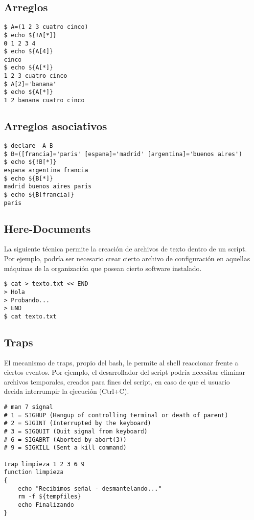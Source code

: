 \subsection{Arreglos}

\begin{lstlisting}
$ A=(1 2 3 cuatro cinco)
$ echo ${!A[*]}
0 1 2 3 4
$ echo ${A[4]}
cinco
$ echo ${A[*]}
1 2 3 cuatro cinco
$ A[2]='banana'
$ echo ${A[*]}
1 2 banana cuatro cinco
\end{lstlisting}

\subsection{Arreglos asociativos}
\begin{lstlisting}
$ declare -A B
$ B=([francia]='paris' [espana]='madrid' [argentina]='buenos aires')
$ echo ${!B[*]}
espana argentina francia
$ echo ${B[*]}
madrid buenos aires paris
$ echo ${B[francia]}
paris
\end{lstlisting}


\subsection{Here-Documents}

La siguiente técnica permite la creación de archivos de texto dentro de un script. Por ejemplo, podría ser 
necesario crear cierto archivo de configuración en aquellas máquinas de la organización que posean cierto 
software instalado. 

\begin{lstlisting}
$ cat > texto.txt << END
> Hola
> Probando...
> END
$ cat texto.txt
\end{lstlisting}

\subsection{Traps}

El mecanismo de traps, propio del bash, le permite al shell reaccionar frente a ciertos eventos. Por ejemplo,
el desarrollador del script podría necesitar eliminar archivos temporales, creados para fines del script, en caso
de que el usuario decida interrumpir la ejecución (Ctrl+C). 

\begin{lstlisting}
# man 7 signal
# 1 = SIGHUP (Hangup of controlling terminal or death of parent)
# 2 = SIGINT (Interrupted by the keyboard)
# 3 = SIGQUIT (Quit signal from keyboard)
# 6 = SIGABRT (Aborted by abort(3))
# 9 = SIGKILL (Sent a kill command)

trap limpieza 1 2 3 6 9
function limpieza
{
	echo "Recibimos señal - desmantelando..."
	rm -f ${tempfiles}
	echo Finalizando
}
\end{lstlisting}




